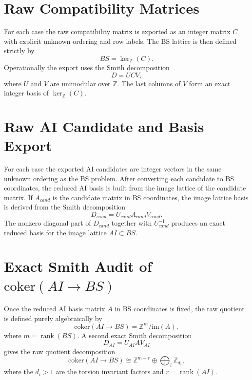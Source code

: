 \documentclass[11pt]{article}
\begin{document}
        \section{Raw Compatibility Matrices}
        For each case the raw compatibility matrix is exported as an integer matrix $C$ with explicit unknown ordering and row labels.
        The BS lattice is then defined strictly by
        \[
          BS = \ker_{\mathbb Z}(C).
        \]
        Operationally the export uses the Smith decomposition
        \[
          D = U C V,
        \]
        where $U$ and $V$ are unimodular over $\mathbb{Z}$.
        The last columns of $V$ form an exact integer basis of $\ker_{\mathbb Z}(C)$.

        \section{Raw AI Candidate and Basis Export}
        For each case the exported AI candidates are integer vectors in the same unknown ordering as the BS problem.
        After converting each candidate to BS coordinates, the reduced AI basis is built from the image lattice of the candidate matrix.
        If $A_{cand}$ is the candidate matrix in BS coordinates, the image lattice basis is derived from the Smith decomposition
        \[
          D_{cand} = U_{cand} A_{cand} V_{cand}.
        \]
        The nonzero diagonal part of $D_{cand}$ together with $U_{cand}^{-1}$ produces an exact reduced basis for the image lattice $AI \subset BS$.

        \section{Exact Smith Audit of \texorpdfstring{$\mathrm{coker}(AI \to BS)$}{coker(AI->BS)}}
        Once the reduced AI basis matrix $A$ in BS coordinates is fixed, the raw quotient is defined purely algebraically by
        \[
          \mathrm{coker}(AI \to BS) = \mathbb{Z}^m / \mathrm{im}(A),
        \]
        where $m = \operatorname{rank}(BS)$.
        A second exact Smith decomposition
        \[
          D_{AI} = U_{AI} A V_{AI}
        \]
        gives the raw quotient decomposition
        \[
          \mathrm{coker}(AI \to BS)
          \cong
          \mathbb{Z}^{m-r}
          \oplus
          \bigoplus_i \mathbb{Z}_{d_i},
        \]
        where the $d_i > 1$ are the torsion invariant factors and $r = \operatorname{rank}(AI)$.
\end{document}
